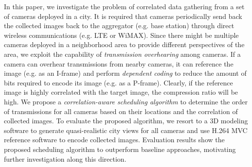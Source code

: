 In this paper, we investigate the problem of correlated data gathering from a set
of cameras deployed in a city. It is required that cameras periodically send back
the collected images back to the aggregator (e.g. base station) through direct 
wireless communications (e.g. LTE or WiMAX).
Since there might be multiple cameras deployed in a neighborhood area to provide
different perspectives of the area, we exploit the capability of {\em transmission overhearing}
among cameras.
If a camera can overhear transmissions from nearby cameras, it can reference the
image (e.g. as an I-frame) and perform {\em dependent coding} to reduce the 
amount of bits required to encode its image (e.g. as a P-frame).
Clearly, if the reference image is highly correlated with the target
image, the compression ratio will be high.
%
We propose a {\em correlation-aware scheduling algorithm} to determine the order of transmissions
for all cameras based on their locations and the correlation of collected images.
To evaluate the proposed algorithm, we resort to a $3$D modeling software to generate
quasi-realistic city views for all cameras and use H.264 MVC reference software to
encode collected images.
Evaluation results show the proposed scheduling algorithm to outperform
baseline approaches, motivating further investigation along this direction.
%

